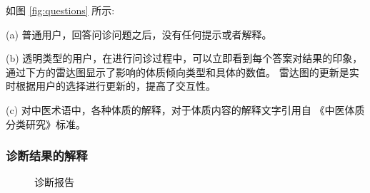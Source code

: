 如图 \ref{fig:questions} 所示:

(a) 普通用户，回答问诊问题之后，没有任何提示或者解释。

(b) 透明类型的用户，在进行问诊过程中，可以立即看到每个答案对结果的印象，通过下方的雷达图显示了影响的体质倾向类型和具体的数值。
雷达图的更新是实时根据用户的选择进行更新的，提高了交互性。

(c) 对中医术语中，各种体质的解释，对于体质内容的解释文字引用自 《中医体质分类研究》标准。



\subsubsection{诊断结果的解释}
\begin{figure}[ht]
    \centering
    \caption{诊断报告}
    \label{fig:my_label}
\end{figure}

